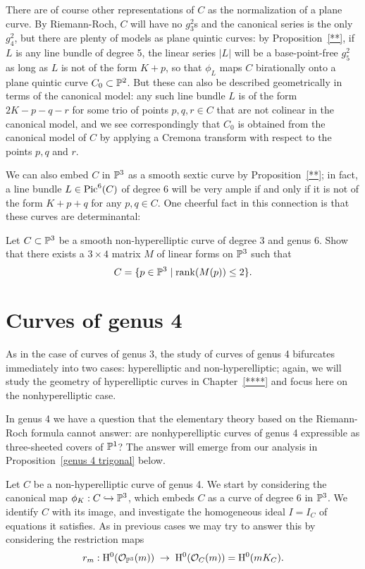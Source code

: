 There are of course other representations of $C$ as the normalization of a plane curve. By Riemann-Roch, $C$ will have no $g^2_3$s and the canonical series is the only $g^2_4$, but there are plenty of models as plane quintic curves: by Proposition~\ref{**}, if $L$ is any line bundle of degree 5, the linear series $|L|$ will be a base-point-free $g^2_5$ as long as $L$ is not of the form $K+p$, so that $\phi_L$ maps $C$ birationally onto a plane quintic curve $C_0 \subset \PP^2$. But these can also be described geometrically in terms of the canonical model: any such line bundle $L$ is of the form $2K-p-q-r$ for some trio of  points $p, q, r \in C$ that are not colinear in the canonical model, and we see correspondingly that $C_0$ is obtained from the canonical model of $C$ by applying a Cremona transform with respect to the points $p, q$ and $r$. 

We can also embed $C$ in $\PP^3$ as a smooth sextic curve by Proposition~\ref{**}; in fact, a line bundle $L \in \pic^6(C)$ of degree 6 will be very ample if and only if it is not of the form $K+p+q$ for any $p, q \in C$. One cheerful fact in this connection is that these curves are determinantal:

\begin{exercise}
Let $C \subset \PP^3$ be a smooth non-hyperelliptic curve of degree 3 and genus 6. Show that there exists a $3 \times 4$ matrix $M$ of linear forms on $\PP^3$ such that 
$$
C = \{ p \in \PP^3 \mid \rank(M(p)) \leq 2 \}.
$$
\end{exercise}

\section{Curves of genus 4}

As in the case of curves of genus 3, the study of curves of genus 4 bifurcates immediately into two cases: hyperelliptic and non-hyperelliptic; again, we will study the geometry of hyperelliptic curves in Chapter~\ref{****} and focus here on the nonhyperelliptic case.

In genus 4 we have a question that the elementary theory based on the Riemann-Roch formula cannot answer: are nonhyperelliptic curves of genus 4 expressible as three-sheeted covers of $\PP^1$? The answer will emerge from our analysis in Proposition~\ref{genus 4 trigonal} below.

Let $C$ be a non-hyperelliptic curve of genus 4. We start by considering the canonical map $\phi_K : C \hookrightarrow \PP^3$, which embeds $C$ as a curve of degree 6 in $\PP^3$. We identify $C$ with its image, and investigate the homogeneous ideal $I = I_C$ of equations it satisfies. As in previous cases we may try to answer this by considering the restriction maps
$$
r_m : \HH^0(\cO_{\PP^3}(m)) \; \to \; \HH^0(\cO_{C}(m)) = \HH^0(mK_C).
$$

